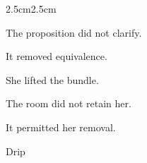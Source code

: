 \begin{center}
\end{center}

\vspace{3em}

\begin{adjustwidth}{2.5cm}{2.5cm}

The proposition did not clarify.

\medskip

It removed equivalence.

\vspace{3em}


\vspace{3em}

She lifted the bundle.

\medskip

The room did not retain her.

\medskip

It permitted her removal.

\vspace{3em}

Drip

\vspace{3em}


\vspace{3em}

\end{adjustwidth}
